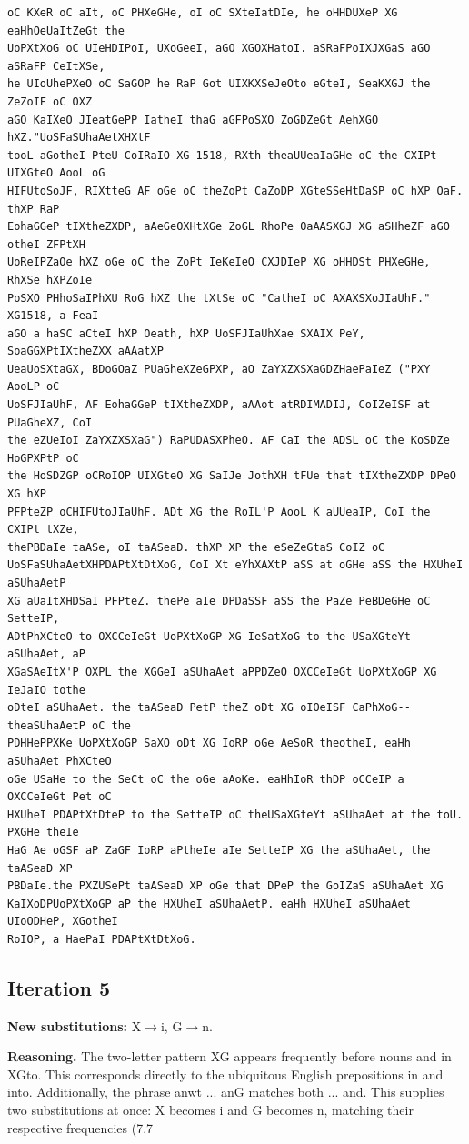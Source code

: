 \documentclass[12pt,a4paper]{article}
\begin{document}
\begin{lstlisting}[caption={Complete text after iteration 4}, label={lst:iter4}]
oC KXeR oC aIt, oC PHXeGHe, oI oC SXteIatDIe, he oHHDUXeP XG eaHhOeUaItZeGt the
UoPXtXoG oC UIeHDIPoI, UXoGeeI, aGO XGOXHatoI. aSRaFPoIXJXGaS aGO aSRaFP CeItXSe,
he UIoUhePXeO oC SaGOP he RaP Got UIXKXSeJeOto eGteI, SeaKXGJ the ZeZoIF oC OXZ
aGO KaIXeO JIeatGePP IatheI thaG aGFPoSXO ZoGDZeGt AehXGO hXZ."UoSFaSUhaAetXHXtF
tooL aGotheI PteU CoIRaIO XG 1518, RXth theaUUeaIaGHe oC the CXIPt UIXGteO AooL oG
HIFUtoSoJF, RIXtteG AF oGe oC theZoPt CaZoDP XGteSSeHtDaSP oC hXP OaF. thXP RaP
EohaGGeP tIXtheZXDP, aAeGeOXHtXGe ZoGL RhoPe OaAASXGJ XG aSHheZF aGO otheI ZFPtXH
UoReIPZaOe hXZ oGe oC the ZoPt IeKeIeO CXJDIeP XG oHHDSt PHXeGHe, RhXSe hXPZoIe
PoSXO PHhoSaIPhXU RoG hXZ the tXtSe oC "CatheI oC AXAXSXoJIaUhF." XG1518, a FeaI
aGO a haSC aCteI hXP Oeath, hXP UoSFJIaUhXae SXAIX PeY, SoaGGXPtIXtheZXX aAAatXP
UeaUoSXtaGX, BDoGOaZ PUaGheXZeGPXP, aO ZaYXZXSXaGDZHaePaIeZ ("PXY AooLP oC
UoSFJIaUhF, AF EohaGGeP tIXtheZXDP, aAAot atRDIMADIJ, CoIZeISF at PUaGheXZ, CoI
the eZUeIoI ZaYXZXSXaG") RaPUDASXPheO. AF CaI the ADSL oC the KoSDZe HoGPXPtP oC
the HoSDZGP oCRoIOP UIXGteO XG SaIJe JothXH tFUe that tIXtheZXDP DPeO XG hXP
PFPteZP oCHIFUtoJIaUhF. ADt XG the RoIL'P AooL K aUUeaIP, CoI the CXIPt tXZe,
thePBDaIe taASe, oI taASeaD. thXP XP the eSeZeGtaS CoIZ oC
UoSFaSUhaAetXHPDAPtXtDtXoG, CoI Xt eYhXAXtP aSS at oGHe aSS the HXUheI aSUhaAetP
XG aUaItXHDSaI PFPteZ. thePe aIe DPDaSSF aSS the PaZe PeBDeGHe oC SetteIP,
ADtPhXCteO to OXCCeIeGt UoPXtXoGP XG IeSatXoG to the USaXGteYt aSUhaAet, aP
XGaSAeItX'P OXPL the XGGeI aSUhaAet aPPDZeO OXCCeIeGt UoPXtXoGP XG IeJaIO tothe
oDteI aSUhaAet. the taASeaD PetP theZ oDt XG oIOeISF CaPhXoG--theaSUhaAetP oC the
PDHHePPXKe UoPXtXoGP SaXO oDt XG IoRP oGe AeSoR theotheI, eaHh aSUhaAet PhXCteO
oGe USaHe to the SeCt oC the oGe aAoKe. eaHhIoR thDP oCCeIP a OXCCeIeGt Pet oC
HXUheI PDAPtXtDteP to the SetteIP oC theUSaXGteYt aSUhaAet at the toU. PXGHe theIe
HaG Ae oGSF aP ZaGF IoRP aPtheIe aIe SetteIP XG the aSUhaAet, the taASeaD XP
PBDaIe.the PXZUSePt taASeaD XP oGe that DPeP the GoIZaS aSUhaAet XG
KaIXoDPUoPXtXoGP aP the HXUheI aSUhaAetP. eaHh HXUheI aSUhaAet UIoODHeP, XGotheI
RoIOP, a HaePaI PDAPtXtDtXoG.
\end{lstlisting}

\clearpage
\subsection{Iteration 5}
\textbf{New substitutions:} X$\to$i, G$\to$n.

\textbf{Reasoning.} The two-letter pattern XG appears frequently before nouns and in XGto. This corresponds directly to the ubiquitous English prepositions in and into. Additionally, the phrase anwt ... anG matches both ... and. This supplies two substitutions at once: X becomes i and G becomes n, matching their respective frequencies (7.7%
\end{document}
